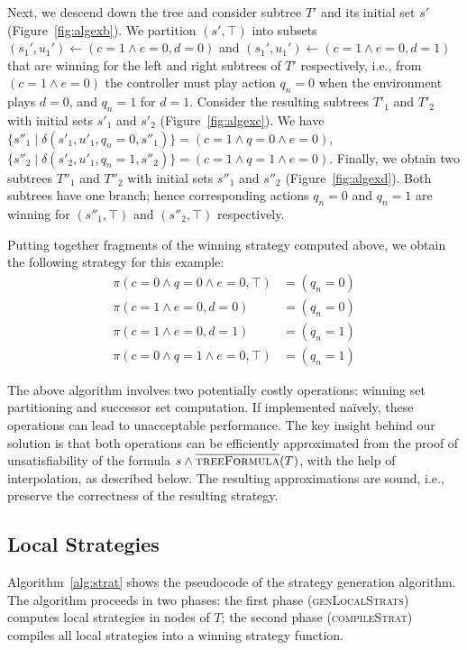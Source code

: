 Next, we descend down the tree and consider subtree $T'$ and its initial set $s'$ (Figure~\ref{fig:algexb}).  We partition $(s', \top)$ into subsets $(s_1', u_1') \gets (c = 1 \land e = 0, d = 0)$ and $(s_1', u_1') \gets (c = 1 \land e = 0, d = 1)$ that are winning for the left and right subtrees of $T'$ respectively, i.e., from $(c = 1 \land e = 0)$ the controller must play action $q_n = 0$ when the environment plays $d = 0$, and $q_n = 1$ for $d = 1$.  Consider the resulting subtrees $T'_1$ and $T'_2$ with initial sets $s'_1$ and $s'_2$ (Figure~\ref{fig:algexc}).  We have $\{ s''_1 \mid \delta(s'_1, u'_1, q_n = 0, s''_1) \} = (c = 1 \land q = 0 \land e = 0)$, $\{ s''_2 \mid \delta(s'_2, u'_1, q_n = 1, s''_2) \} = (c = 1 \land q = 1 \land e = 0)$.  Finally, we obtain two subtrees $T''_1$ and $T''_2$ with initial sets $s''_1$ and $s''_2$ (Figure~\ref{fig:algexd}).  Both subtrees have one branch; hence corresponding actions $q_n = 0$ and $q_n = 1$ are winning for $(s''_1, \top)$ and $(s''_2, \top)$ respectively.

Putting together fragments of the winning strategy computed above, we obtain the following strategy for this example:
\begin{align*}
    \pi(c = 0 \land q = 0 \land e = 0, \top) &= (q_n = 0) \\
    \pi(c = 1 \land e = 0, d = 0) &= (q_n = 0) \\
    \pi(c = 1 \land e = 0, d = 1) &= (q_n = 1) \\
    \pi(c = 0 \land q = 1 \land e = 0, \top) &= (q_n = 1)
\end{align*}

The above algorithm involves two potentially costly operations: winning set partitioning and successor set computation.  If implemented na\"ively, these operations can lead to unacceptable performance.  The key insight behind our solution is that both operations can be efficiently approximated from the proof of unsatisfiability of the formula $s \land \textsc{$\overline{\mbox{treeFormula}}$}(T)$, with the help of interpolation, as described below.  The resulting approximations are sound, i.e., preserve the correctness of the resulting strategy.

\subsection{Local Strategies}

Algorithm~\ref{alg:strat} shows the pseudocode of the strategy generation algorithm.  The algorithm proceeds in two phases: the first phase (\textsc{genLocalStrats}) computes local strategies in nodes of $T$; the second phase (\textsc{compileStrat}) compiles all local strategies into a winning strategy function.

